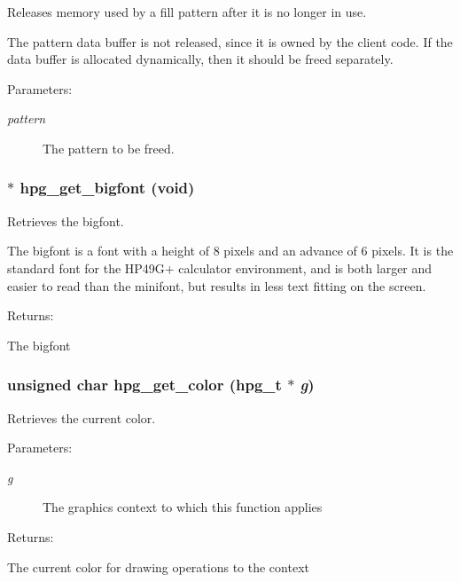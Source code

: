 Releases memory used by a fill pattern after it is no longer in use.

The pattern data buffer is not released, since it is owned by the client code. If the data buffer is allocated dynamically, then it should be freed separately.\begin{Desc}
\item[Parameters: ]\par
\begin{description}
\item[{\em 
pattern}]The pattern to be freed. \end{description}
\end{Desc}
\subsubsection{$\ast$ hpg\_\-get\_\-bigfont (void)}\label{hpgraphics_8h_a57}


Retrieves the bigfont.

The bigfont is a font with a height of 8 pixels and an advance of 6 pixels. It is the standard font for the HP49G+ calculator environment, and is both larger and easier to read than the minifont, but results in less text fitting on the screen.

\begin{Desc}
\item[Returns: ]\par
The bigfont \end{Desc}
\subsubsection{\setlength{\rightskip}{0pt plus 5cm}unsigned char hpg\_\-get\_\-color ({\bf hpg\_\-t} $\ast$ {\em g})}\label{hpgraphics_8h_a62}


Retrieves the current color.

\begin{Desc}
\item[Parameters: ]\par
\begin{description}
\item[{\em 
g}]The graphics context to which this function applies \end{description}
\end{Desc}
\begin{Desc}
\item[Returns: ]\par
The current color for drawing operations to the context \end{Desc}
